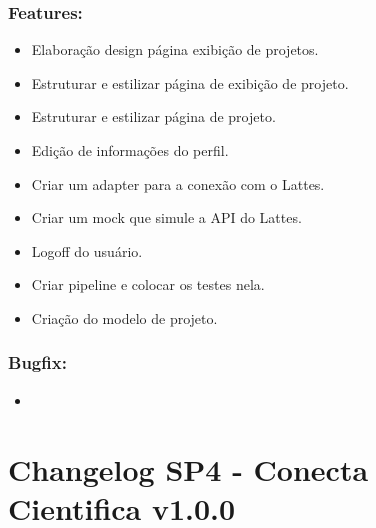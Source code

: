 \documentclass[
40pt,				%
openright,			%
oneside,			%
a4paper,			%
chapter=TITLE,		%
sumario=tradicional,
english,			%
]{abntex2}
\begin{document}
	\subsection*{\textbf{Features:}}
	\begin{itemize} \setlength\itemsep{0em}
		
		\item Elaboração design página exibição de projetos.
		\item Estruturar e estilizar página de exibição de projeto.
		\item Estruturar e estilizar página de projeto.
		\item Edição de informações do perfil.
		\item Criar um adapter para a conexão com o Lattes.
		\item Criar um mock que simule a API do Lattes.
		\item Logoff do usuário.
		\item Criar pipeline e colocar os testes nela.
		\item Criação do modelo de projeto.

	\end{itemize}

	\subsection*{\textbf{Bugfix:}}
	\begin{itemize} \setlength\itemsep{0em}

		\item   

	\end{itemize}

	\chapter*{Changelog SP4 - Conecta Cientifica v1.0.0} 
	
\end{document}
